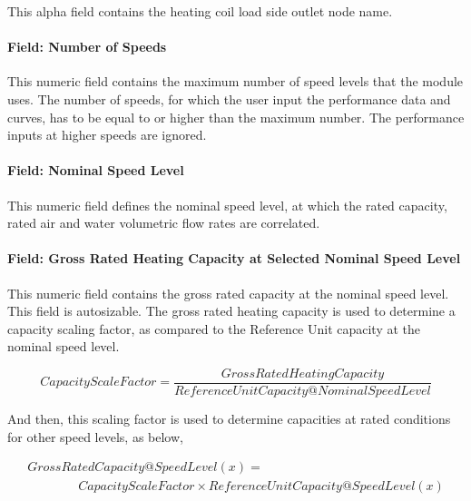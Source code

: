 This alpha field contains the heating coil load side outlet node name.

\paragraph{Field: Number of Speeds}\label{field-number-of-speeds-5}

This numeric field contains the maximum number of speed levels that the module uses. The number of speeds, for which the user input the performance data and curves, has to be equal to or higher than the maximum number. The performance inputs at higher speeds are ignored.

\paragraph{Field: Nominal Speed Level}\label{field-nominal-speed-level-3}

This numeric field defines the nominal speed level, at which the rated capacity, rated air and water volumetric flow rates are correlated.

\paragraph{Field: Gross Rated Heating Capacity at Selected Nominal Speed Level}\label{field-gross-rated-heating-capacity-at-selected-nominal-speed-level-1}

This numeric field contains the gross rated capacity at the nominal speed level. This field is autosizable. The gross rated heating capacity is used to determine a capacity scaling factor, as compared to the Reference Unit capacity at the nominal speed level.

\begin{equation}
CapacityScaleFactor = \frac{{GrossRatedHeatingCapacity}}{{ReferenceUnitCapacity@NominalSpeedLevel}}
\end{equation}

And then, this scaling factor is used to determine capacities at rated conditions for other speed levels, as below,

\begin{equation}
  \begin{array}{l}
    GrossRatedCapacity@SpeedLevel \left( x \right) = \\
    \quad \quad \quad \quad CapacityScaleFactor \times ReferenceUnitCapacity@SpeedLevel(x)
  \end{array}
\end{equation}


